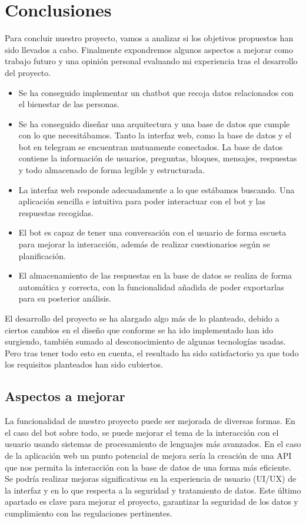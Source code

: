 \chapter{Conclusiones}

Para concluir nuestro proyecto, vamos a analizar si los objetivos propuestos han sido llevados a cabo. Finalmente expondremos algunos aspectos a mejorar como trabajo futuro y una opinión personal evaluando mi experiencia tras el desarrollo del proyecto. 

\begin{itemize}
    \item Se ha conseguido implementar un chatbot que recoja datos relacionados con el bienestar de las personas.
    \item Se ha conseguido diseñar una arquitectura y una base de datos que cumple con lo que necesitábamos. Tanto la interfaz web, como la base de datos y el bot en telegram se encuentran mutuamente conectados. La base de datos contiene la información de usuarios, preguntas, bloques, mensajes, respuestas y todo almacenado de forma legible y estructurada.
    \item La interfaz web responde adecuadamente a lo que estábamos buscando. Una aplicación sencilla e intuitiva para poder interactuar con el bot y las respuestas recogidas.
    \item El bot es capaz de tener una conversación con el usuario de forma escueta para mejorar la interacción, además de realizar cuestionarios según se planificación.
    \item El almacenamiento de las respuestas en la base de datos se realiza de forma automática y correcta, con la funcionalidad añadida de poder exportarlas para su posterior análisis.
\end{itemize}

El desarrollo del proyecto se ha alargado algo más de lo planteado, debido a ciertos cambios en el diseño que conforme se ha ido implementado han ido surgiendo, también sumado al desconocimiento de algunas tecnologías usadas. Pero tras tener todo esto en cuenta, el resultado ha sido satisfactorio ya que todo los requisitos planteados han sido cubiertos. 



 \section{Aspectos a mejorar}

La funcionalidad de nuestro proyecto puede ser mejorada de diversas formas. En el caso del bot sobre todo, se puede mejorar el tema de la interacción con el usuario usando sistemas de procesamiento de lenguajes más avanzados. En el caso de la aplicación web un punto potencial de mejora sería la creación de una API que nos permita la interacción con la base de datos de una forma más eficiente. Se podría realizar mejoras significativas en la experiencia de usuario (UI/UX) de la interfaz y en lo que respecta a la seguridad y tratamiento de datos. Este último apartado es clave para mejorar el proyecto, garantizar la seguridad de los datos y cumplimiento con las regulaciones pertinentes.

